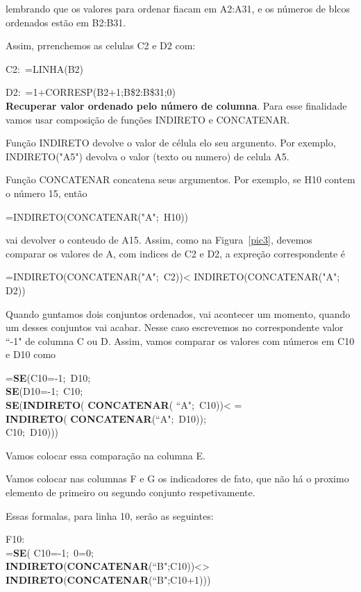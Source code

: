 \documentclass[12pt]{article}
\begin{document}
\noindent lembrando que os valores para ordenar fiacam em A2:A31,
e os n\'umeros de blcos ordenados est\~ao em B2:B31.

Assim, prrenchemos as celulas C2 e D2 com:

C2:\ =LINHA(B2)

D2:\ =1+CORRESP(B2+1;B\$2:B\$31;0)\\

\textbf{Recuperar valor ordenado pelo n\'umero de columna}. Para
esse finalidade vamos usar composi\c{c}\~ao de fun\c{c}\~oes
INDIRETO e CONCATENAR.

Fun\c{c}\~ao INDIRETO devolve o valor de c\'elula elo seu
argunento. Por exemplo, INDIRETO("A5") devolva o valor (texto ou
numero) de celula A5.

Fun\c{c}\~ao CONCATENAR concatena seus argumentos. Por exemplo, se
H10 contem o n\'umero 15, ent\~ao

\centerline{=INDIRETO(CONCATENAR("A";\, H10))}

\noindent vai devolver o conteudo de A15. Assim, como na
Figura~\ref{pic3}, devemos comparar os valores de A, com indices
de C2 e D2, a expre\c{c}\~ao correspondente \'e

\centerline{=INDIRETO(CONCATENAR("A";\, C2))\textless
INDIRETO(CONCATENAR("A";\, D2))}

Quando guntamos dois conjuntos ordenados, vai acontecer um
momento, quando um desses conjuntos vai acabar. Nesse caso
escrevemos no correspondente valor ``-1" de columna C ou D. Assim,
vamos comparar os valores com n\'umeros em C10 e D10 como

\noindent
=\textbf{SE}(C10=-1;\, D10;\\
\textbf{SE}(D10=-1;\, C10;\\
\textbf{SE}(\textbf{INDIRETO}(
\textbf{CONCATENAR}( ``A";\, C10))\textless
=\\
\textbf{INDIRETO}( \textbf{CONCATENAR}(``A";\, D10));\\
C10;\, D10)))

Vamos colocar essa compara\c{c}\~ao na columna E.

Vamos colocar nas columnas F e G os indicadores de fato, que n\~ao
h\'a o proximo elemento de primeiro ou segundo conjunto
respetivamente.

Essas formalas, para linha 10, ser\~ao as seguintes:

\noindent
F10:\\
=\textbf{SE}( C10=-1;\,
0=0;\\
\textbf{INDIRETO}(\textbf{CONCATENAR}(``B";C10))\textless\textgreater\\
\textbf{INDIRETO}(\textbf{CONCATENAR}(``B";C10+1)))
\end{document}
